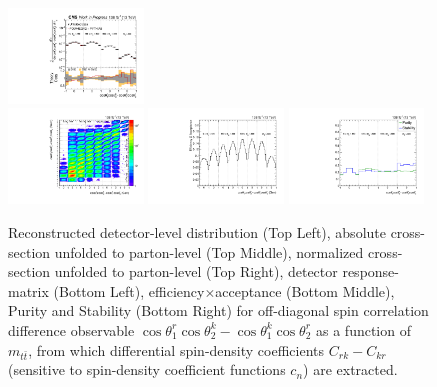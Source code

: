 \begin{refsection}
\begin{figure}[htb]
\begin{center}
 \includegraphics[width=0.32\textwidth]{fig_fullRun2UL/unfolding/combined/UnfoldedResultsNorm_c_Mrk_mttbar.pdf} \\
 \includegraphics[width=0.32\textwidth]{fig_fullRun2UL/unfolding/combined/ResponseMatrix_c_Mrk_mttbar.pdf}
 \includegraphics[width=0.32\textwidth]{fig_fullRun2UL/unfolding/combined/TotEff_c_Mrk_mttbar.pdf}
 \includegraphics[width=0.32\textwidth]{fig_fullRun2UL/unfolding/combined/PurStab_c_Mrk_mttbar.pdf} \\
\caption{Reconstructed detector-level distribution (Top Left), absolute cross-section unfolded to parton-level (Top Middle), normalized cross-section unfolded to parton-level (Top Right), detector response-matrix (Bottom Left), efficiency$\times$acceptance (Bottom Middle), Purity and Stability (Bottom Right) for off-diagonal spin correlation difference observable $\cos\theta_{1}^{r}\cos\theta_{2}^{k}-\cos\theta_{1}^{k}\cos\theta_{2}^{r}$ as a function of $m_{t\bar{t}}$, from which differential spin-density coefficients $C_{rk}-C_{kr}$ (sensitive to spin-density coefficient functions $c_n$) are extracted.}
\label{fig:c_Mrk_mttbar}
\end{center}
\end{figure}
\clearpage

\end{refsection}
